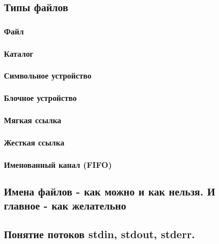 \subsection{Типы файлов}
\subsubsection{Файл}
\subsubsection{Каталог}
\subsubsection{Символьное устройство}
\subsubsection{Блочное устройство}
\subsubsection{Мягкая ссылка}
\subsubsection{Жесткая ссылка}
\subsubsection{Именованный канал (FIFO)}
\subsection{Имена файлов - как можно и как нельзя. И главное - как желательно}
\subsection{Понятие потоков stdin, stdout, stderr.}
